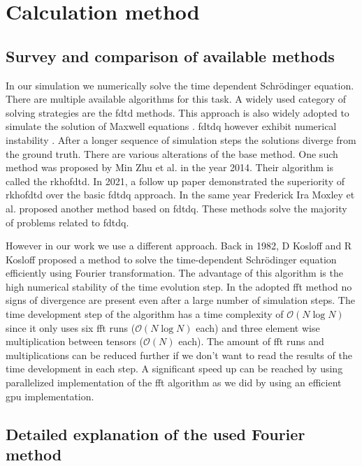 \section{Calculation method}
\label{sec:used_method}

\subsection{Survey and comparison of available methods}

In our simulation we numerically solve the time dependent Schrödinger equation.
There are multiple available algorithms for this task.
A widely used category of solving strategies are the \acrfull{fdtd} methods.
This approach is also widely adopted to simulate the solution of Maxwell equations \cite{maxwell1865, Ulf2001}.
\acrfull{fdtdq} however exhibit numerical instability \cite{Soriano2004}.
After a longer sequence of simulation steps the solutions diverge from the ground truth.
There are various alterations of the base method.
One such method was proposed by Min Zhu et al. \cite{Zhu2014} in the year 2014.
Their algorithm is called the \acrfull{rkhofdtd}.
In 2021, a follow up paper \cite{Zhu_Wang_2021} demonstrated the superiority of \acrshort{rkhofdtd} over the basic \acrshort{fdtdq} approach.
In the same year Frederick Ira Moxley et al. \cite{MOXLEY20122434} proposed another method based on \acrshort{fdtdq}.
These methods solve the majority of problems related to \acrshort{fdtdq}.

However in our work we use a different approach.
Back in 1982, D Kosloff and R Kosloff proposed a method \cite{KOSLOFF198335} to solve the time-dependent Schrödinger equation efficiently using Fourier transformation.
The advantage of this algorithm is the high numerical stability of the time evolution step.
In the adopted \acrshort{fft} method no signs of divergence are present even after a large number of simulation steps.
The time development step of the algorithm has a time complexity of $\mathcal{O}(N\log N)$ since it only uses six \acrshort{fft} runs ($\mathcal{O}(N\log N)$ each) and three element wise multiplication between tensors ($\mathcal{O}(N)$ each).
The amount of \acrshort{fft} runs and multiplications can be reduced further if we don't want to read the results of the time development in each step.
A significant speed up can be reached by using parallelized implementation of the \acrshort{fft} algorithm as we did by using an efficient \acrshort{gpu} implementation.

\subsection{Detailed explanation of the used Fourier method}

